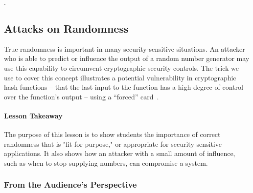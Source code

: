 %

.

\subsection{Attacks on Randomness}

True randomness is important in many
security-sensitive situations.
An attacker who is able to predict or influence the output of a random number
generator may use this capability to circumvent cryptographic security controls.
The trick we use to cover this concept
illustrates a potential vulnerability in cryptographic hash functions
-- that the last input to the function has a high degree of control over the function's output -- using a ``forced'' card~\cite{forcingcard}.

\paragraph{Lesson Takeaway}

The purpose of this lesson is to show students the importance of correct
randomness
that is "fit for purpose," or appropriate for security-sensitive applications.
It also shows how an attacker
with a small amount of influence,
such as when to stop supplying numbers,
can compromise a
system.


\subsubsection{From the Audience's Perspective}

